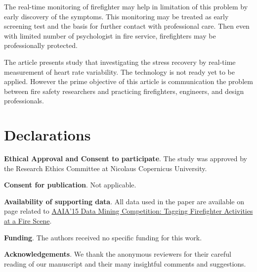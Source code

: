 \documentclass[twocolumn]{bmcart}
\begin{document}
The real-time monitoring of firefighter may help in limitation of this problem by early discovery of the symptoms. This monitoring may be treated as early screening test and the basis for further contact with professional care. Then even with limited number of psychologist in fire service, firefighters may be professionally protected.

The article presents study that investigating the stress recovery by real-time measurement of heart rate variability. The technology is not ready yet to be applied. However the prime objective of this article is communication the problem between fire safety researchers and practicing firefighters, engineers, and design professionals.

\section{Declarations}

\textbf{Ethical Approval and Consent to participate}. The study was approved by the Research Ethics Committee at Nicolaus Copernicus University.

\textbf{Consent for publication}. Not applicable. %

\textbf{Availability of supporting data}. All data used in the paper are available on page related to \href{https://knowledgepit.fedcsis.org/contest/view.php?id=106}{AAIA'15 Data Mining Competition: Tagging Firefighter Activities at a Fire Scene}.

\textbf{Funding}. The authors received no specific funding for this work.

\textbf{Acknowledgements}. We thank the anonymous reviewers for their careful reading of our manuscript and their many insightful comments and suggestions.



\end{document}

